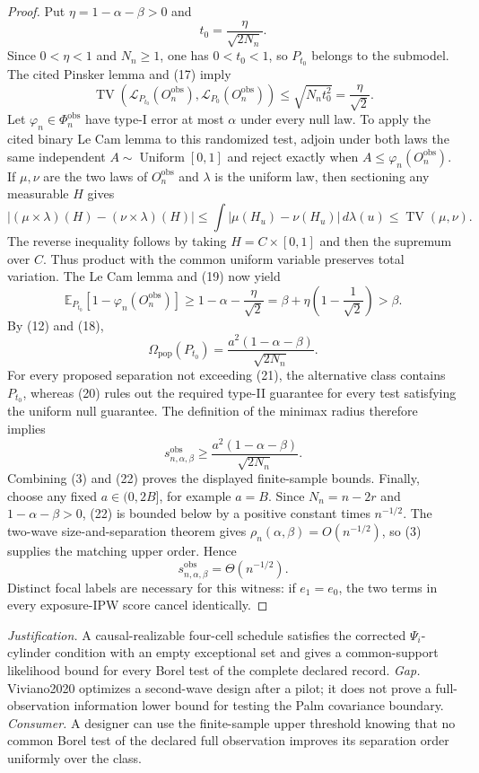 \documentclass{article}
\begin{document}
\begin{proof}
Put \(\eta=1-\alpha-\beta>0\) and
\[
 t_0=\frac{\eta}{\sqrt{2N_n}}. \tag{18}
\]
Since \(0<\eta<1\) and \(N_n\ge1\), one has \(0<t_0<1\), so \(P_{t_0}\) belongs to the submodel.  The cited Pinsker lemma and (17) imply
\[
 \operatorname{TV}\!\left(
  \mathcal L_{P_{t_0}}(O_n^{\mathrm{obs}}),
  \mathcal L_{P_0}(O_n^{\mathrm{obs}})
 \right)
 \le\sqrt{N_nt_0^2}
 =\frac{\eta}{\sqrt2}. \tag{19}
\]
Let \(\varphi_n\in\Phi_n^{\mathrm{obs}}\) have type-I error at most \(\alpha\) under every null law.  To apply the cited binary Le Cam lemma to this randomized test, adjoin under both laws the same independent \(A\sim\operatorname{Uniform}[0,1]\) and reject exactly when \(A\le\varphi_n(O_n^{\mathrm{obs}})\).  If \(\mu,\nu\) are the two laws of \(O_n^{\mathrm{obs}}\) and \(\lambda\) is the uniform law, then sectioning any measurable \(H\) gives
\[
 |(\mu\times\lambda)(H)-(\nu\times\lambda)(H)|
 \le\int|\mu(H_u)-\nu(H_u)|\,d\lambda(u)
 \le\operatorname{TV}(\mu,\nu).
\]
The reverse inequality follows by taking \(H=C\times[0,1]\) and then the supremum over \(C\).  Thus product with the common uniform variable preserves total variation.  The Le Cam lemma and (19) now yield
\[
 \mathbb E_{P_{t_0}}[1-\varphi_n(O_n^{\mathrm{obs}})]
 \ge1-\alpha-\frac{\eta}{\sqrt2}
 =\beta+\eta\left(1-\frac1{\sqrt2}\right)
 >\beta. \tag{20}
\]
By (12) and (18),
\[
 \Omega_{\mathrm{pop}}(P_{t_0})
 =\frac{a^2(1-\alpha-\beta)}{\sqrt{2N_n}}. \tag{21}
\]
For every proposed separation not exceeding (21), the alternative class contains \(P_{t_0}\), whereas (20) rules out the required type-II guarantee for every test satisfying the uniform null guarantee.  The definition of the minimax radius therefore implies
\[
 s_{n,\alpha,\beta}^{\mathrm{obs}}
 \ge\frac{a^2(1-\alpha-\beta)}{\sqrt{2N_n}}. \tag{22}
\]
Combining (3) and (22) proves the displayed finite-sample bounds.  Finally, choose any fixed \(a\in(0,2B]\), for example \(a=B\).  Since \(N_n=n-2r\) and \(1-\alpha-\beta>0\), (22) is bounded below by a positive constant times \(n^{-1/2}\).  The two-wave size-and-separation theorem gives \(\rho_n(\alpha,\beta)=O(n^{-1/2})\), so (3) supplies the matching upper order.  Hence
\[
 s_{n,\alpha,\beta}^{\mathrm{obs}}=\Theta(n^{-1/2}).
\]
Distinct focal labels are necessary for this witness: if \(e_1=e_0\), the two terms in every exposure-IPW score cancel identically.
\end{proof}
\par\smallskip\noindent \textit{Justification.} A causal-realizable four-cell schedule satisfies the corrected \(\Psi_i\)-cylinder condition with an empty exceptional set and gives a common-support likelihood bound for every Borel test of the complete declared record. \textit{Gap.} Viviano2020 optimizes a second-wave design after a pilot; it does not prove a full-observation information lower bound for testing the Palm covariance boundary. \textit{Consumer.} A designer can use the finite-sample upper threshold knowing that no common Borel test of the declared full observation improves its separation order uniformly over the class.
\end{document}
